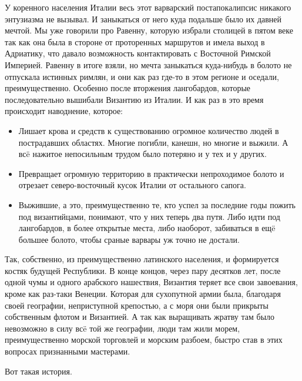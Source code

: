 У коренного населения Италии весь этот варварский постапокалипсис никакого энтузиазма не вызывал. И заныкаться от него куда подальше было их давней мечтой. Мы уже говорили про Равенну, которую избрали столицей в пятом веке так как она была в стороне от проторенных маршрутов и имела выход в Адриатику, что давало возможность контактировать с Восточной Римской Империей. Равенну в итоге взяли, но мечта заныкаться куда-нибудь в болото не отпускала истинных римлян, и они как раз где-то в этом регионе и оседали, преимущественно. Особенно после вторжения лангобардов, которые последовательно вышибали Византию из Италии. И как раз в это время происходит наводнение, которое:


\begin{itemize}
	\item Лишает крова и средств к существованию огромное количество людей в пострадавших областях. Многие погибли, канешн, но многие и выжили. А всë нажитое непосильным трудом было потеряно и у тех и у других.
	\item  Превращает огромную территорию в практически непроходимое болото и отрезает северо-восточный кусок Италии от остального сапога.
	\item  Выжившие, а это, преимущественно те, кто успел за последние годы пожить под византийцами, понимают, что у них теперь два путя. Либо идти под лангобардов, в более открытые места, либо наоборот, забиваться в ещë большее болото, чтобы сраные варвары уж точно не достали.
\end{itemize}

Так, собственно, из преимущественно латинского населения, и формируется костяк будущей Республики. В конце концов, через пару десятков лет, после одной чумы и одного арабского нашествия, Византия теряет все свои завоевания, кроме как раз-таки Венеции. Которая для сухопутной армии была, благодаря своей географии, неприступной крепостью, а с моря они были прикрыты собственным флотом и Византией. А так как выращивать жратву там было невозможно в силу всë той же географии, люди там жили морем, преимущественно морской торговлей и морским разбоем, быстро став в этих вопросах признанными мастерами.


Вот такая история. 